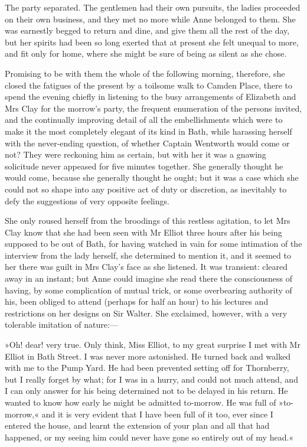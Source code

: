 The party separated. The gentlemen had their own pursuits, the ladies proceeded on their own business, and they met no more while Anne belonged to them. She was earnestly begged to return and dine, and give them all the rest of the day, but her spirits had been so long exerted that at present she felt unequal to more, and fit only for home, where she might be sure of being as silent as she chose.

Promising to be with them the whole of the following morning, therefore, she closed the fatigues of the present by a toilsome walk to Camden Place, there to spend the evening chiefly in listening to the busy arrangements of Elizabeth and Mrs Clay for the morrow's party, the frequent enumeration of the persons invited, and the continually improving detail of all the embellishments which were to make it the most completely elegant of its kind in Bath, while harassing herself with the never-ending question, of whether Captain Wentworth would come or not? They were reckoning him as certain, but with her it was a gnawing solicitude never appeased for five minutes together. She generally thought he would come, because she generally thought he ought; but it was a case which she could not so shape into any positive act of duty or discretion, as inevitably to defy the suggestions of very opposite feelings.

She only roused herself from the broodings of this restless agitation, to let Mrs Clay know that she had been seen with Mr Elliot three hours after his being supposed to be out of Bath, for having watched in vain for some intimation of the interview from the lady herself, she determined to mention it, and it seemed to her there was guilt in Mrs Clay's face as she listened. It was transient: cleared away in an instant; but Anne could imagine she read there the consciousness of having, by some complication of mutual trick, or some overbearing authority of his, been obliged to attend (perhaps for half an hour) to his lectures and restrictions on her designs on Sir Walter. She exclaimed, however, with a very tolerable imitation of nature:—

»Oh! dear! very true. Only think, Miss Elliot, to my great surprise I met with Mr Elliot in Bath Street. I was never more astonished. He turned back and walked with me to the Pump Yard. He had been prevented setting off for Thornberry, but I really forget by what; for I was in a hurry, and could not much attend, and I can only answer for his being determined not to be delayed in his return. He wanted to know how early he might be admitted to-morrow. He was full of »to-morrow,« and it is very evident that I have been full of it too, ever since I entered the house, and learnt the extension of your plan and all that had happened, or my seeing him could never have gone so entirely out of my head.«